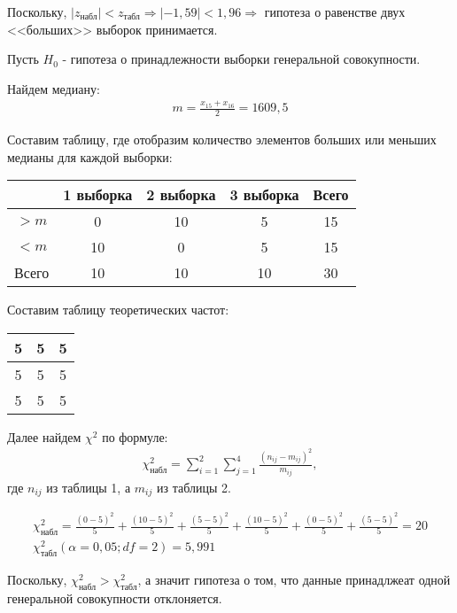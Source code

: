 \documentclass[utf8, a4paper, 14pt, russian, oneside]{book}
\begin{document}
Поскольку, $|z_{\text{набл}}| < z_{\text{табл}} \Rightarrow |-1,59| < 1,96 \Rightarrow$ гипотеза о равенстве двух <<больших>> выборок принимается.
\newpage


Пусть $H_0$ - гипотеза о принадлежности выборки генеральной совокупности.

Найдем медиану:
\begin{align*}
    m = \frac{x_{15} + x_{16}}{2} = 1609,5
\end{align*}

Составим таблицу, где отобразим количество элементов больших или меньших медианы для каждой выборки:
\begin{table}[h!]
    \centering
    \begin{tabular}{|c|c|c|c|c|}
        \hline
        & 1 выборка & 2 выборка & 3 выборка & Всего \\ \hline
        $ > m$ & 0 & 10 & 5 & 15 \\ \hline
        $ < m$ & 10 & 0 & 5 & 15 \\ \hline
        Всего & 10 & 10 & 10 & 30 \\ \hline
    \end{tabular}
\end{table}

Составим таблицу теоретических частот:
\begin{table}[h!]
    \centering 
    \begin{tabular}{|c|c|c|}
        \hline 
        5 & 5 & 5 \\ \hline
        5 & 5 & 5 \\ \hline
        5 & 5 & 5 \\ \hline
    \end{tabular}
\end{table}

Далее найдем $\chi^2$ по формуле:
\begin{align*}
    \chi^2_{\text{набл}} = \sum^2_{i=1}\sum^4_{j=1}\frac{(n_{ij} - m_{ij})^2}{m_{ij}},
\end{align*}
где $n_{ij}$ из таблицы 1, а $m_{ij}$ из таблицы 2.

\begin{gather*}
    \chi^2_{\text{набл}} = 
    \frac{(0 - 5)^2}{5} +
    \frac{(10 - 5)^2}{5} +
    \frac{(5 - 5)^2}{5} +
    \frac{(10 - 5)^2}{5} +
    \frac{(0 - 5)^2}{5} +
    \frac{(5 - 5)^2}{5} = 20 \\
    \chi^2_{\text{табл}}(\alpha = 0,05; df=2) = 5,991
\end{gather*}

Поскольку, $\chi^2_{\text{набл}} > \chi^2_{\text{табл}}$, а значит гипотеза о том, что данные принадлжеат одной генеральной совокупности отклоняется.

\newpage

\end{document}
